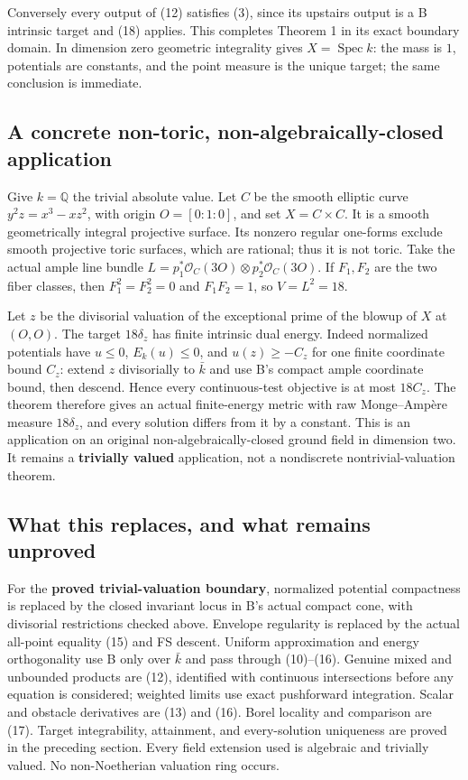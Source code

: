 \documentclass[
  11pt,
]{article}
\begin{document}
Conversely every output of (12) satisfies (3), since its upstairs output
is a B intrinsic target and (18) applies. This completes Theorem 1 in
its exact boundary domain. In dimension zero geometric integrality gives
\(X=\operatorname{Spec}k\): the mass is \(1\), potentials are constants,
and the point measure is the unique target; the same conclusion is
immediate.

\subsection{A concrete non-toric, non-algebraically-closed
application}\label{a-concrete-non-toric-non-algebraically-closed-application}

Give \(k=\mathbb Q\) the trivial absolute value. Let \(C\) be the smooth
elliptic curve \(y^2z=x^3-xz^2\), with origin \(O=[0:1:0]\), and set
\(X=C\times C\). It is a smooth geometrically integral projective
surface. Its nonzero regular one-forms exclude smooth projective toric
surfaces, which are rational; thus it is not toric. Take the actual
ample line bundle
\(L=p_1^*\mathcal O_C(3O)\otimes p_2^*\mathcal O_C(3O)\). If \(F_1,F_2\)
are the two fiber classes, then \(F_1^2=F_2^2=0\) and \(F_1F_2=1\), so
\(V=L^2=18\).

Let \(z\) be the divisorial valuation of the exceptional prime of the
blowup of \(X\) at \((O,O)\). The target \(18\delta_z\) has finite
intrinsic dual energy. Indeed normalized potentials have \(u\leq0\),
\(E_k(u)\leq0\), and \(u(z)\geq-C_z\) for one finite coordinate bound
\(C_z\): extend \(z\) divisorially to \(\bar k\) and use B's compact
ample coordinate bound, then descend. Hence every continuous-test
objective is at most \(18C_z\). The theorem therefore gives an actual
finite-energy metric with raw Monge--Ampère measure \(18\delta_z\), and
every solution differs from it by a constant. This is an application on
an original non-algebraically-closed ground field in dimension two. It
remains a \textbf{trivially valued} application, not a nondiscrete
nontrivial-valuation theorem.

\subsection{What this replaces, and what remains
unproved}\label{what-this-replaces-and-what-remains-unproved}

For the \textbf{proved trivial-valuation boundary}, normalized potential
compactness is replaced by the closed invariant locus in B's actual
compact cone, with divisorial restrictions checked above. Envelope
regularity is replaced by the actual all-point equality (15) and FS
descent. Uniform approximation and energy orthogonality use B only over
\(\bar k\) and pass through (10)--(16). Genuine mixed and unbounded
products are (12), identified with continuous intersections before any
equation is considered; weighted limits use exact pushforward
integration. Scalar and obstacle derivatives are (13) and (16). Borel
locality and comparison are (17). Target integrability, attainment, and
every-solution uniqueness are proved in the preceding section. Every
field extension used is algebraic and trivially valued. No
non-Noetherian valuation ring occurs.
\end{document}
